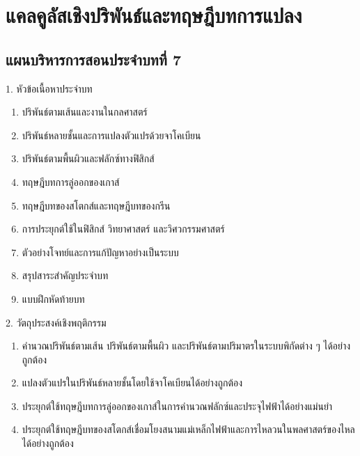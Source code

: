 \chapter{แคลคูลัสเชิงปริพันธ์และทฤษฎีบทการแปลง}

\section*{แผนบริหารการสอนประจำบทที่ 7}

\begin{planbox}[colframe=rbruNavy, colbacktitle=rbruNavy]{1. หัวข้อเนื้อหาประจำบท}
\begin{enumerate}[topsep=2pt, itemsep=1pt, partopsep=0pt, parsep=0pt, leftmargin=1.5em]
    \item ปริพันธ์ตามเส้นและงานในกลศาสตร์
    \item ปริพันธ์หลายชั้นและการแปลงตัวแปรด้วยจาโคเบียน
    \item ปริพันธ์ตามพื้นผิวและฟลักซ์ทางฟิสิกส์
    \item ทฤษฎีบทการลู่ออกของเกาส์
    \item ทฤษฎีบทของสโตกส์และทฤษฎีบทของกรีน
    \item การประยุกต์ใช้ในฟิสิกส์ วิทยาศาสตร์ และวิศวกรรมศาสตร์
    \item ตัวอย่างโจทย์และการแก้ปัญหาอย่างเป็นระบบ
    \item สรุปสาระสำคัญประจำบท
    \item แบบฝึกหัดท้ายบท
\end{enumerate}
\end{planbox}

\begin{planbox}[colframe=rbruGreen, colbacktitle=rbruGreen]{2. วัตถุประสงค์เชิงพฤติกรรม}
\begin{enumerate}[topsep=2pt, itemsep=1pt, partopsep=0pt, parsep=0pt, leftmargin=1.5em]
    \item คำนวณปริพันธ์ตามเส้น ปริพันธ์ตามพื้นผิว และปริพันธ์ตามปริมาตรในระบบพิกัดต่าง ๆ ได้อย่างถูกต้อง
    \item แปลงตัวแปรในปริพันธ์หลายชั้นโดยใช้จาโคเบียนได้อย่างถูกต้อง
    \item ประยุกต์ใช้ทฤษฎีบทการลู่ออกของเกาส์ในการคำนวณฟลักซ์และประจุไฟฟ้าได้อย่างแม่นยำ
    \item ประยุกต์ใช้ทฤษฎีบทของสโตกส์เชื่อมโยงสนามแม่เหล็กไฟฟ้าและการไหลวนในพลศาสตร์ของไหลได้อย่างถูกต้อง
\end{enumerate}
\end{planbox}

